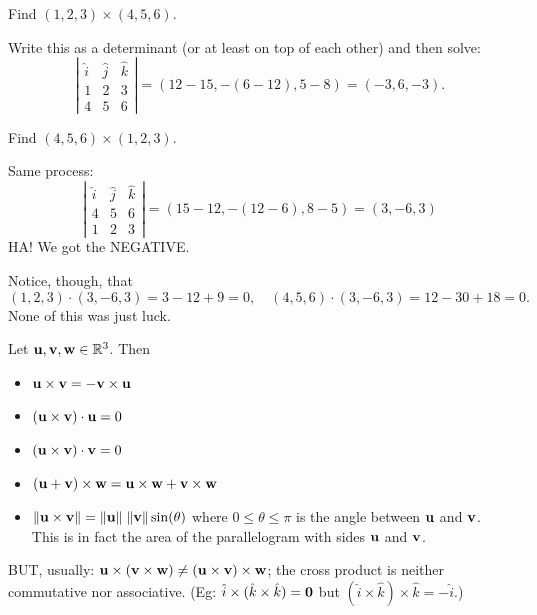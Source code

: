 \begin{myprob}
Find $(1,2,3)\times(4,5,6)$.

\begin{mysol}  Write this as a determinant (or at least on top of each other)
and then solve:
$$
\left| \begin{matrix}
\hat{i} & \hat{j} & \hat{k} \\
1 & 2 & 3\\
4 & 5 & 6 \end{matrix} \right|
= (12-15, -(6-12), 5-8) = (-3,6,-3). 
$$
\end{mysol}\end{myprob}

\begin{myprob} Find $(4,5,6)\times(1,2,3)$.

\begin{mysol} Same process:
$$
\left| \begin{matrix}
\hat{i} & \hat{j} & \hat{k} \\
4 & 5 & 6\\
1 & 2 & 3 \end{matrix} \right|
= (15-12, -(12-6), 8-5) = (3,-6,3)
$$
HA!  We got the NEGATIVE. 
\end{mysol}\end{myprob}

Notice, though, that
$$
(1,2,3)\cdot (3,-6,3) = 3-12+9 = 0, \quad (4,5,6)\cdot (3,-6,3) = 12-30+18=0.
$$
None of this was just luck.

\begin{theorem}
Let $\mathbf{u},\mathbf{v},\mathbf{w}\in \mathbb{R}^3$.  Then
\begin{itemize}
\item $\mathbf{u} \times \mathbf{v} = -\mathbf{v} \times \mathbf{u}$
\item $(\mathbf{u} \times \mathbf{v})\cdot \mathbf{u} = 0$
\item $(\mathbf{u} \times \mathbf{v})\cdot \mathbf{v} = 0$
\item $(\mathbf{u} + \mathbf{v})\times \mathbf{w} = \mathbf{u} \times \mathbf{w} + \mathbf{v} \times \mathbf{w}$
\item $\Vert \mathbf{u} \times \mathbf{v} \Vert = \Vert \mathbf{u} \Vert \; \Vert \mathbf{v} \Vert \sin(\theta)$ where $0 \leq \theta \leq \pi$ is the angle between $\mathbf{u}$ and $\mathbf{v}$.
This is in fact the area of the parallelogram with sides $\mathbf{u}$ and $\mathbf{v}$.
\end{itemize}
BUT, usually:  $\mathbf{u} \times (\mathbf{v} \times \mathbf{w}) \neq (\mathbf{u} \times \mathbf{v}) \times \mathbf{w}$;
the cross product is neither commutative nor associative.  (Eg:  $\hat{i} \times (\hat{k} \times \hat{k}) = \mathbf{0}$ but $(\hat{i} \times \hat{k})\times \hat{k} = -\hat{i}$.)
\end{theorem}


